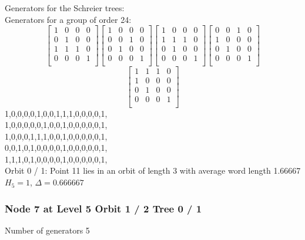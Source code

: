 Generators for the Schreier trees:\\
{\small\arraycolsep=2pt
Generators for a group of order 24:
$$
\left[
\begin{array}{*{4}{r}}
1 & 0 & 0 & 0\\
0 & 1 & 0 & 0\\
1 & 1 & 1 & 0\\
0 & 0 & 0 & 1\\
\end{array}
\right]
\left[
\begin{array}{*{4}{r}}
1 & 0 & 0 & 0\\
0 & 0 & 1 & 0\\
0 & 1 & 0 & 0\\
0 & 0 & 0 & 1\\
\end{array}
\right]
\left[
\begin{array}{*{4}{r}}
1 & 0 & 0 & 0\\
1 & 1 & 1 & 0\\
0 & 1 & 0 & 0\\
0 & 0 & 0 & 1\\
\end{array}
\right]
\left[
\begin{array}{*{4}{r}}
0 & 0 & 1 & 0\\
1 & 0 & 0 & 0\\
0 & 1 & 0 & 0\\
0 & 0 & 0 & 1\\
\end{array}
\right]
$$
$$
\left[
\begin{array}{*{4}{r}}
1 & 1 & 1 & 0\\
1 & 0 & 0 & 0\\
0 & 1 & 0 & 0\\
0 & 0 & 0 & 1\\
\end{array}
\right]
$$
1,0,0,0,0,1,0,0,1,1,1,0,0,0,0,1,\\
1,0,0,0,0,0,1,0,0,1,0,0,0,0,0,1,\\
1,0,0,0,1,1,1,0,0,1,0,0,0,0,0,1,\\
0,0,1,0,1,0,0,0,0,1,0,0,0,0,0,1,\\
1,1,1,0,1,0,0,0,0,1,0,0,0,0,0,1,\\
}
\noindent Orbit 0 / 1: Point 11 lies in an orbit of length 3 with average word length 1.66667 $H_{5} = 1$, $\Delta = 0.666667$\\
\subsubsection*{Node 7 at Level 5 Orbit 1 / 2 Tree 0 / 1}
Number of generators 5\\

